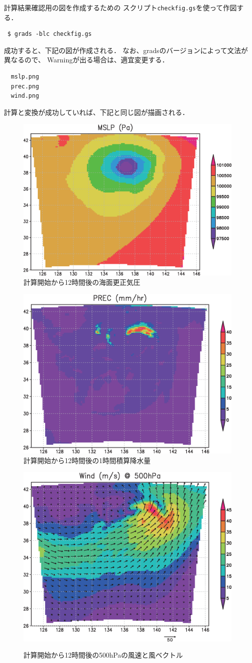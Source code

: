 計算結果確認用の図を作成するための
スクリプト\verb|checkfig.gs|を使って作図する．
\begin{verbatim}
 $ grads -blc checkfig.gs
\end{verbatim}
成功すると、下記の図が作成される．
なお、gradsのバージョンによって文法が異なるので、
Warningが出る場合は、適宜変更する．
\begin{verbatim}
  mslp.png
  prec.png
  wind.png
\end{verbatim}
計算と変換が成功していれば、下記と同じ図が描画される．

\begin{figure}[h]
\begin{center}
  \includegraphics[width=0.55\hsize]{./figure/real_mslp.eps}\\
  \caption{計算開始から12時間後の海面更正気圧}
  \label{fig:real_mslp}
\end{center}
\begin{center}
  \includegraphics[width=0.55\hsize]{./figure/real_prec.eps}\\
  \caption{計算開始から12時間後の1時間積算降水量}
  \label{fig:real_prec}
\end{center}
\begin{center}
  \includegraphics[width=0.55\hsize]{./figure/real_wind.eps}\\
  \caption{計算開始から12時間後の500hPaの風速と風ベクトル}
  \label{fig:real_wind}
\end{center}
\end{figure}



